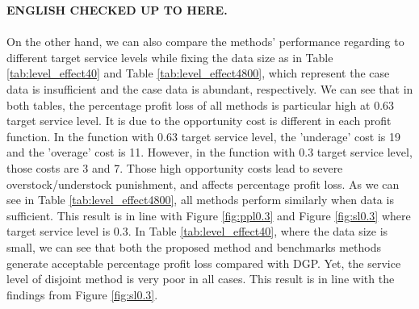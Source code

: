 \documentclass{article}
\begin{document}
\begin{table}[ht]
\caption{Size effect at 0.3 target service level}
\label{tab:size_effect0.3}
\centering {} 
\end{table}

\noindent
{\bf ENGLISH CHECKED UP TO HERE.}\\
\\
On the other hand, we can also compare the methods' performance regarding to different target service levels while fixing the data size as in Table \ref{tab:level_effect40} and Table \ref{tab:level_effect4800}, which represent the case data is insufficient and the case data is abundant, respectively. We can see that in both tables, the percentage profit loss of all methods is particular high at 0.63 target service level. It is due to the opportunity cost is different in each profit function. In the function with 0.63 target service level, the 'underage' cost is 19 and the 'overage' cost is 11. However, in the function with 0.3 target service level, those costs are 3 and 7. Those high opportunity costs lead to severe overstock/understock punishment, and affects percentage profit loss. As we can see in Table \ref{tab:level_effect4800}, all methods perform similarly when data is sufficient. This result is in line with Figure \ref{fig:ppl0.3} and Figure \ref{fig:sl0.3} where target service level is 0.3. In Table \ref{tab:level_effect40}, where the data size is small, we can see that both the proposed method and benchmarks methods generate acceptable percentage profit loss compared with DGP. Yet, the service level of disjoint method is very poor in all cases. This result is in line with the findings from Figure \ref{fig:sl0.3}.
\end{document}

